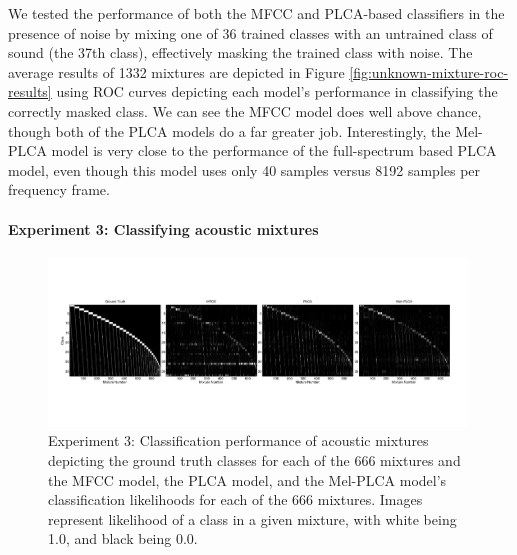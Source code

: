 \documentclass[a4paper,10pt,final]{ThesisStyle}
\begin{document}
We tested the performance of both the MFCC and PLCA-based classifiers in the presence of noise by mixing one of 36 trained classes with an untrained class of sound (the 37th class), effectively masking the trained class with noise.  The average results of 1332 mixtures are depicted in Figure \ref{fig:unknown-mixture-roc-results} using ROC curves depicting each model's performance in classifying the correctly masked class.  We can see the MFCC model does well above chance, though both of the PLCA models do a far greater job.  Interestingly, the Mel-PLCA model is very close to the performance of the full-spectrum based PLCA model, even though this model uses only 40 samples versus 8192 samples per frequency frame.

\paragraph{Experiment 3: Classifying acoustic mixtures}


\begin{figure}
\centering
\includegraphics[width=0.99\textwidth]{images/mixture-img-results.pdf}
\caption{Experiment 3: Classification performance of acoustic mixtures depicting the ground truth classes for each of the 666 mixtures and the MFCC model, the PLCA model, and the Mel-PLCA model's classification likelihoods for each of the 666 mixtures. Images represent likelihood of a class in a given mixture, with white being 1.0, and black being 0.0.}
\label{fig:mixture-images}
\end{figure}
\end{document}
